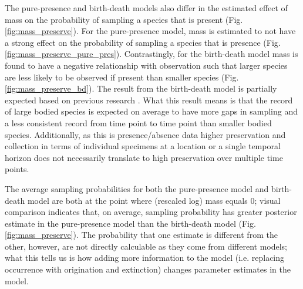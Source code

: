 \documentclass[12pt,letterpaper]{article}
\begin{document}
The pure-presence and birth-death models also differ in the estimated effect of mass on the probability of sampling a species that is present (Fig. \ref{fig:mass_preserve}). For the pure-presence model, mass is estimated to not have a strong effect on the probability of sampling a species that is presence (Fig. \ref{fig:mass_preserve_pure_pres}). Contrastingly, for the birth-death model mass is found to have a negative relationship with observation such that larger species are less likely to be observed if present than smaller species (Fig. \ref{fig:mass_preserve_bd}). The result from the birth-death model is partially expected based on previous research \citep{Damuth1982}. What this result means is that the record of large bodied species is expected on average to have more gaps in sampling and a less consistent record from time point to time point than smaller bodied species. Additionally, as this is presence/absence data higher preservation and collection in terms of individual specimens at a location or a single temporal horizon does not necessarily translate to high preservation over multiple time points.

The average sampling probabilities for both the pure-presence model and birth-death model are both at the point where (rescaled log) mass equals 0; visual comparison indicates that, on average, sampling probability has greater posterior estimate in the pure-presence model than the birth-death model (Fig.\ref{fig:mass_preserve}). The probability that one estimate is different from the other, however, are not directly calculable as they come from different models; what this tells us is how adding more information to the model (i.e. replacing occurrence with origination and extinction) changes parameter estimates in the model.
\end{document}
